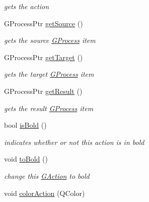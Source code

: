 \begin{DoxyCompactItemize}
\begin{DoxyCompactList}\small\item\em gets the action \end{DoxyCompactList}\item 
G\+Process\+Ptr \hyperlink{classGAction_a4f4c104269fd0d40a61b22458db42dee}{get\+Source} ()
\begin{DoxyCompactList}\small\item\em gets the source \hyperlink{classGProcess}{G\+Process} item \end{DoxyCompactList}\item 
G\+Process\+Ptr \hyperlink{classGAction_ac7aff6bc03be3791a8a20a914aae5b2c}{get\+Target} ()
\begin{DoxyCompactList}\small\item\em gets the target \hyperlink{classGProcess}{G\+Process} item \end{DoxyCompactList}\item 
G\+Process\+Ptr \hyperlink{classGAction_ae1ed003118c8333c6afa2e8d30e3dc07}{get\+Result} ()
\begin{DoxyCompactList}\small\item\em gets the result \hyperlink{classGProcess}{G\+Process} item \end{DoxyCompactList}\item 
\hypertarget{classGAction_a29954530df3ca052ba3c7ad5f56de9b3}{bool \hyperlink{classGAction_a29954530df3ca052ba3c7ad5f56de9b3}{is\+Bold} ()}\label{classGAction_a29954530df3ca052ba3c7ad5f56de9b3}

\begin{DoxyCompactList}\small\item\em indicates whether or not this action is in bold \end{DoxyCompactList}\item 
\hypertarget{classGAction_ac50e5adaea34a8e9b358907c32f58f6a}{void \hyperlink{classGAction_ac50e5adaea34a8e9b358907c32f58f6a}{to\+Bold} ()}\label{classGAction_ac50e5adaea34a8e9b358907c32f58f6a}

\begin{DoxyCompactList}\small\item\em change this \hyperlink{classGAction}{G\+Action} to bold \end{DoxyCompactList}\item 
\hypertarget{classGAction_ac6834abb04c34cefed63cb0515e6a712}{void \hyperlink{classGAction_ac6834abb04c34cefed63cb0515e6a712}{color\+Action} (Q\+Color)}\label{classGAction_ac6834abb04c34cefed63cb0515e6a712}


\end{DoxyCompactItemize}
